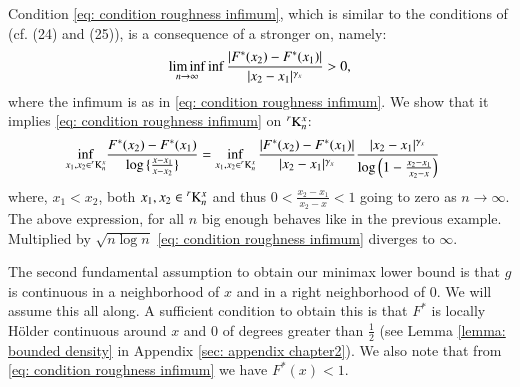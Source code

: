 \begin{example}
Condition \eqref{eq: condition roughness infimum}, which is similar to the conditions of \cite{10} (cf. (24) and (25)), is a consequence of a stronger on, namely: 
$$\liminf_{n \rightarrow \infty } \inf \frac{|F^*(x_2)-F^*(x_1)|}{|x_2 - x_1|^{\gamma_{\scaleto{x}{2.2pt}}} } > 0,$$ 
where the infimum is as in \eqref{eq: condition roughness infimum}. We show that it implies \eqref{eq: condition roughness infimum} on $\prescript{r}{}{\mathrm{K}}^{x}_n$:
\begin{align*}
    \inf_{\substack{x_1, x_2 \in \prescript{r}{}{\mathrm{K}}^{x}_n}} &\frac{F^*(x_2) - F^*(x_1)}{\log{\{\frac{x-x_1}{x-x_2} \}}} = \inf_{\substack{x_1, x_2 \in \prescript{r}{}{\mathrm{K}}^{x}_n }} \frac{|F^*(x_2)-F^*(x_1)|}{|x_2 - x_1|^{\gamma_{\scaleto{x}{2.2pt}}} } \frac{|x_2 - x_1|^{\gamma_{\scaleto{x}{2.2pt}}}}{\log{\left( 1 - \frac{x_2 - x_1}{x_2-x} \right)}}
\end{align*}
where, $x_1 < x_2$, both $x_1, x_2 \in \prescript{r}{}{\mathrm{K}}^{x}_n$ and thus $0<\frac{x_2 - x_1}{x_2 - x} <1$ going to zero as $n \rightarrow \infty$. The above expression, for all $n$ big enough behaves like in the previous example. Multiplied by $\sqrt{n\log{n}}$ \eqref{eq: condition roughness infimum} diverges to $\infty$.
\end{example}

The second fundamental assumption to obtain our minimax lower bound is that $g$ is continuous in a neighborhood of $x$ and in a right neighborhood of $0$. We will assume this all along. A sufficient condition to obtain this is that $F^*$ is locally Hölder continuous around $x$ and $0$ of degrees greater than $\frac{1}{2}$ (see Lemma \ref{lemma: bounded density} in Appendix \ref{sec: appendix chapter2}). We also note that from \eqref{eq: condition roughness infimum} we have $F^*(x)<1$.

